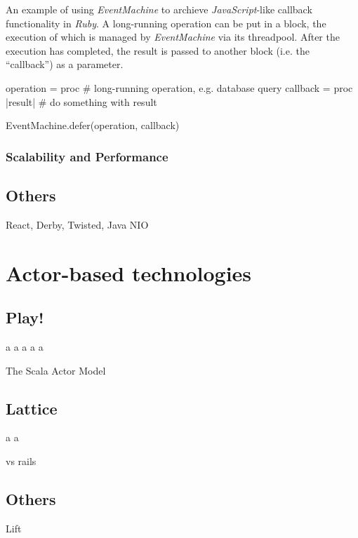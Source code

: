 \begin{program}
  \caption{An example of using \textit{EventMachine} to archieve \textit{JavaScript}-like callback functionality in \textit{Ruby}. A long-running operation can be put in a block, the execution of which is managed by \textit{EventMachine} via its threadpool. After the execution has completed, the result is passed to another block (i.e. the ``callback'') as a parameter.}
  \label{prog:ruby-defer}
  \begin{JavaCode}
operation = proc {
    # long-running operation, e.g. database query
}
callback = proc { |result|
    # do something with result
}

EventMachine.defer(operation, callback)
  \end{JavaCode}
\end{program}

\subsubsection*{Scalability and Performance}


\subsection{Others}
React, Derby, Twisted, Java NIO

\section{Actor-based technologies}

\subsection{Play!} \newpage a \newpage a \newpage a \newpage a \newpage a

The Scala Actor Model


\subsection{Lattice} \newpage a \newpage a

vs rails

\subsection{Others}
Lift











































